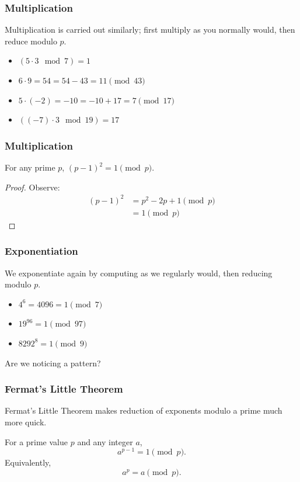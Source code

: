 \documentclass{beamer}
\newcommand{\<}{\langle}
\renewcommand{\>}{\rangle}
\begin{document}
\begin{frame}
\frametitle{Multiplication}

Multiplication is carried out similarly; first multiply as you normally would, then reduce modulo $p$.
\begin{itemize}
\item $(5\cdot 3 \mod 7) = 1$
\item $6\cdot 9 = 54 = 54 - 43 = 11 \pmod{43}$
\item $5\cdot(-2) = -10 = -10 + 17 = 7\pmod{17}$
\item $((-7)\cdot 3 \mod{19}) = 17$
\end{itemize}
\end{frame}

\begin{frame}
\frametitle{Multiplication}

\begin{theorem}
For any prime $p$, $(p-1)^2 = 1\pmod p$.
\end{theorem}
\begin{proof}
Observe:
\begin{align*}
(p-1)^2 &= p^2 -2p + 1 \pmod p\\
	&= 1 \pmod p
\end{align*}
\end{proof}
\end{frame}


\begin{frame}
\frametitle{Exponentiation}

We exponentiate again by computing as we regularly would, then reducing modulo $p$.
\begin{itemize}
\item $4^6 = 4096 = 1 \pmod 7$
\item $19^{96} = 1 \pmod{97}$
\item $8292^8 = 1 \pmod 9$
\end{itemize}
Are we noticing a pattern?
\end{frame}

\begin{frame}
\frametitle{Fermat's Little Theorem}

Fermat's Little Theorem makes reduction of exponents modulo a prime much more quick.

\begin{theorem}
For a prime value $p$ and any integer $a$, 
\[
a^{p-1} = 1 \pmod p.
\]
Equivalently,
\[
a^p = a \pmod p.
\]
\end{theorem}
\end{frame}
\end{document}
